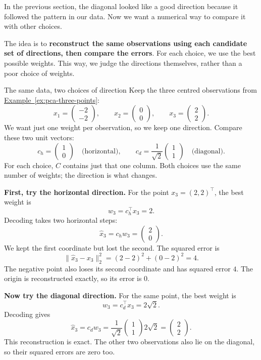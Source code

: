 \documentclass[a4paper,12pt,oneside]{report}
\begin{document}
In the previous section, the diagonal looked like a good direction
because it followed the pattern in our data. Now we want a numerical
way to compare it with other choices.

The idea is to \textbf{reconstruct the same observations using each
candidate set of directions, then compare the errors}.
For each choice, we use the best possible weights. This way, we judge
the directions themselves, rather than a poor choice of weights.

\begin{framedexample}{The same data, two choices of direction}\label{ex:pca-reconstruction-choice}
Keep the three centred observations from
\hyperref[ex:pca-three-points]{Example~\ref*{ex:pca-three-points}}:
\[
  x_1=\begin{pmatrix}-2\\-2\end{pmatrix},\qquad
  x_2=\begin{pmatrix}0\\0\end{pmatrix},\qquad
  x_3=\begin{pmatrix}2\\2\end{pmatrix}.
\]
We want just one weight per observation, so we keep one direction.
Compare these two unit vectors:
\[
  c_h=\begin{pmatrix}1\\0\end{pmatrix}
  \quad\text{(horizontal)},\qquad
  c_d=\frac1{\sqrt2}\begin{pmatrix}1\\1\end{pmatrix}
  \quad\text{(diagonal)}.
\]
For each choice, $C$ contains just that one column. Both choices
use the same number of weights; the direction is what changes.

\textbf{First, try the horizontal direction.}
For the point $x_3=(2,2)^\top$, the best weight is
\[
  w_3=c_h^\top x_3=2.
\]
Decoding takes two horizontal steps:
\[
  \hat{x}_3=c_hw_3=\begin{pmatrix}2\\0\end{pmatrix}.
\]
We kept the first coordinate but lost the second. The squared error is
\[
  \lVert\hat{x}_3-x_3\rVert_2^2
   =(2-2)^2+(0-2)^2=4.
\]
The negative point also loses its second coordinate and has squared
error $4$. The origin is reconstructed exactly, so its error is $0$.

\textbf{Now try the diagonal direction.}
For the same point, the best weight is
\[
  w_3=c_d^\top x_3=2\sqrt2.
\]
Decoding gives
\[
  \hat{x}_3=c_dw_3=
  \frac1{\sqrt2}\begin{pmatrix}1\\1\end{pmatrix}2\sqrt2
  =\begin{pmatrix}2\\2\end{pmatrix}.
\]
This reconstruction is exact. The other two observations also lie
on the diagonal, so their squared errors are zero too.


\end{framedexample}
\end{document}
